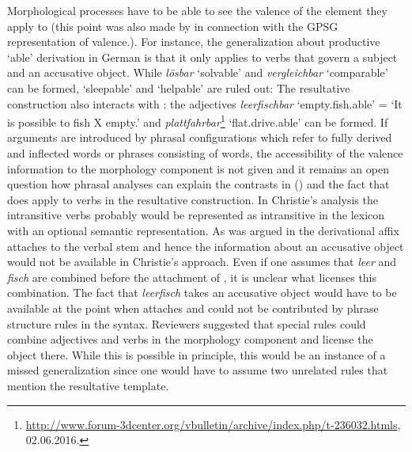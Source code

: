 Morphological processes have to be able to see the valence of the element they apply to (this point
was also made by  in connection with the
GPSG representation of valence.). For instance, the generalization
about productive  `able' derivation in German is that it only applies to
verbs that govern a subject and an accusative object. While \emph{lösbar} `solvable' and
\emph{ver\-gleich\-bar} `comparable' can be formed,  `sleepable' and  `helpable' are ruled out:
\eal
\settowidth{}
\zl
The resultative construction also interacts with \bard: the adjectives \emph{leerfischbar}
`empty.fish.able' = `It is possible to fish X empty.' and \emph{plattfahrbar}\footnote{%
  \url{http://www.forum-3dcenter.org/vbulletin/archive/index.php/t-236032.htmls}, 02.06.2016.
} `flat.drive.able' can be formed. If arguments are introduced by phrasal configurations which refer to
fully derived and inflected words or phrases consisting of words, the
accessibility of the valence information to the morphology component is not given and it remains an
open question how phrasal analyses can explain the contrasts in () and the fact that
\bard does apply to verbs in the resultative construction. In Christie's analysis the intransitive
verbs probably would be represented as intransitive in the lexicon with an optional semantic
representation. As was argued in  the derivational affix attaches to the verbal
stem and hence the information about an accusative object would not be available in Christie's
approach. Even if one assumes that \emph{leer} and \emph{fisch} are combined before the attachment
of , it is unclear what licenses this combination. The fact that \emph{leerfisch} takes
an accusative object would have to be available at the point when  attaches and could
not be contributed by phrase structure rules in the syntax. Reviewers suggested that special rules
could combine adjectives and verbs in the morphology component and license the object there. While
this is possible in principle, this would be an instance of a missed generalization since one would
have to assume two unrelated rules that mention the resultative template.

